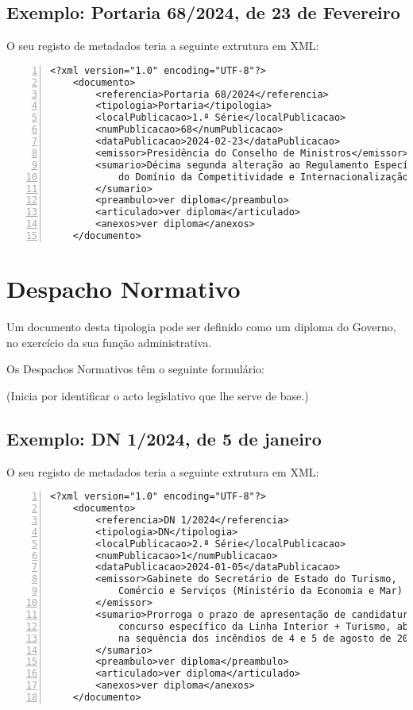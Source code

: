 \subsection{Exemplo: Portaria 68/2024, de 23 de Fevereiro} 
    
O seu registo de metadados teria a seguinte extrutura em XML:
    
\begin{Verbatim}[frame=single, numbers=left, fontsize=\small, commandchars=\\\{\}]
<?xml version="1.0" encoding="UTF-8"?>
    <documento>
        <referencia>Portaria 68/2024</referencia>
        <tipologia>Portaria</tipologia>
        <localPublicacao>1.ª Série</localPublicacao>
        <numPublicacao>68</numPublicacao>
        <dataPublicacao>2024-02-23</dataPublicacao>
        <emissor>Presidência do Conselho de Ministros</emissor>
        <sumario>Décima segunda alteração ao Regulamento Específico 
            do Domínio da Competitividade e Internacionalização
        </sumario>
        <preambulo>ver diploma</preambulo>
        <articulado>ver diploma</articulado>
        <anexos>ver diploma</anexos>
    </documento>
\end{Verbatim}


\section{Despacho Normativo}

Um documento desta tipologia pode ser definido como um diploma do Governo, 
no exercício da sua função administrativa. 

Os Despachos Normativos têm o seguinte formulário:

\begin{quoting}
    (Inicia por identificar o acto legislativo que lhe serve de base.)
\end{quoting}


\subsection{Exemplo: DN 1/2024, de 5 de janeiro} 
    
O seu registo de metadados teria a seguinte extrutura em XML:
    
\begin{Verbatim}[frame=single, numbers=left, fontsize=\small, commandchars=\\\{\}]
<?xml version="1.0" encoding="UTF-8"?>
    <documento>
        <referencia>DN 1/2024</referencia>
        <tipologia>DN</tipologia>
        <localPublicacao>2.ª Série</localPublicacao>
        <numPublicacao>1</numPublicacao>
        <dataPublicacao>2024-01-05</dataPublicacao>
        <emissor>Gabinete do Secretário de Estado do Turismo, 
            Comércio e Serviços (Ministério da Economia e Mar)
        </emissor>
        <sumario>Prorroga o prazo de apresentação de candidaturas ao 
            concurso específico da Linha Interior + Turismo, aberto 
            na sequência dos incêndios de 4 e 5 de agosto de 2023
        </sumario>
        <preambulo>ver diploma</preambulo>
        <articulado>ver diploma</articulado>
        <anexos>ver diploma</anexos>
    </documento>
\end{Verbatim}

